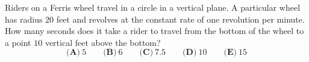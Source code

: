 Riders on a Ferris wheel travel in a circle in a vertical plane. A particular wheel has radius $20$ feet and revolves at the constant rate of one revolution per minute. How many seconds does it take a rider to travel from the bottom of the wheel to a point $10$ vertical feet above the bottom?
\[\textbf{(A)}\ 5\qquad\textbf{(B)}\ 6\qquad\textbf{(C)}\ 7.5\qquad\textbf{(D)}\ 10\qquad\textbf{(E)}\ 15\]
